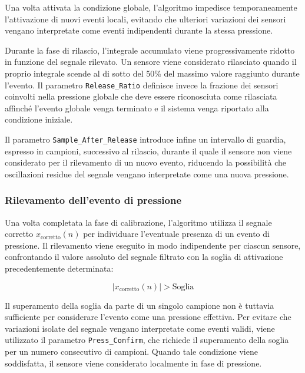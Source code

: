 \documentclass[10pt, a4paper]{article}
\begin{document}
                Una volta attivata la condizione globale, l'algoritmo impedisce temporaneamente l'attivazione di nuovi eventi locali, evitando che ulteriori variazioni dei sensori vengano
                interpretate come eventi indipendenti durante la stessa pressione.

                Durante la fase di rilascio, l'integrale accumulato viene progressivamente ridotto in funzione del segnale rilevato. Un sensore viene considerato rilasciato quando il proprio integrale 
                scende al di sotto del 50\% del massimo valore raggiunto durante l'evento. Il parametro \texttt{Release\_Ratio} definisce invece la frazione dei sensori coinvolti nella pressione 
                globale che deve essere riconosciuta come rilasciata affinché l'evento globale venga terminato e il sistema venga riportato alla condizione iniziale.

                Il parametro \texttt{Sample\_After\_Release} introduce infine un intervallo di guardia, espresso in campioni, successivo al 
                rilascio, durante il quale il sensore non viene considerato per il rilevamento di un nuovo evento, riducendo la possibilità che oscillazioni residue del segnale vengano
                interpretate come una nuova pressione.

            \subsubsection{Rilevamento dell'evento di pressione}
                Una volta completata la fase di calibrazione, l'algoritmo utilizza il segnale corretto $x_{\mathrm{corretto}}(n)$ per individuare l'eventuale presenza di un evento di pressione. 
                Il rilevamento viene eseguito in modo indipendente per ciascun sensore, confrontando il valore assoluto del segnale filtrato con la soglia di attivazione precedentemente determinata:

                    \begin{equation}
                    |x_{\mathrm{corretto}}(n)| > \mathrm{Soglia}
                    \end{equation}

                Il superamento della soglia da parte di un singolo campione non è tuttavia sufficiente per considerare l'evento come una pressione effettiva. Per evitare che variazioni isolate 
                del segnale vengano interpretate come eventi validi, viene utilizzato il parametro \texttt{Press\_Confirm}, che richiede il superamento della soglia per un numero consecutivo di campioni. 
                Quando tale condizione viene soddisfatta, il sensore viene considerato localmente in fase di pressione.
\end{document}
